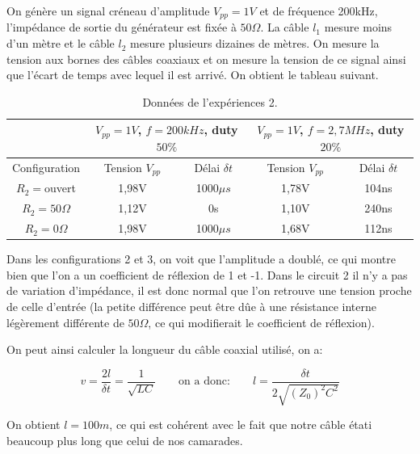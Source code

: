 \documentclass[12pt,a4paper, french]{article}
\begin{document}
    On génère un signal créneau d’amplitude $V_{pp}=1V$ et de fréquence 200kHz, 
    l’impédance de sortie du générateur est fixée à $50\Omega $. La câble $l_1$ mesure moins d’un 
    mètre et le câble $l_2$ mesure plusieurs dizaines de mètres. On mesure la tension aux 
    bornes des câbles coaxiaux et on mesure la tension de ce signal ainsi que l’écart 
    de temps avec lequel il est arrivé. On obtient le tableau suivant. 
    \begin{center}
        \begin{table}[!h]
        \centering
        \begin{tabular}{|c|c|c|c|c|} \hline
            & \multicolumn{2}{c|}{$V_{pp}=1V$, $f=200kHz$, duty $50\%$} &\multicolumn{2}{c|}{$V_{pp}=1V$, $f=2,7MHz$, duty $20\%$}\\ \hline
             Configuration& Tension $V_{pp}$ & Délai $\delta t$& Tension $V_{pp}$ & Délai $\delta t$ \\ \hline
             $R_2=$ouvert & 1,98V & 1000$\mu s$ & 1,78V & 104ns \\ \hline
            $R_2=50\Omega $ &  1,12V & 0s & 1,10V & 240ns\\ \hline
            $R_2=0\Omega $ & 1,98V & 1000$\mu s$& 1,68V&112ns \\ \hline
         \end{tabular}
         \caption{Données de l'expériences 2.}
        \end{table}
    \end{center}
    \medbreak
    
    Dans les configurations 2 et 3, on voit que l'amplitude a doublé, 
    ce qui montre bien que l'on a un coefficient de réflexion de 1 et -1. Dans le 
    circuit 2 il n'y a pas de variation d'impédance, il est donc normal que l'on 
    retrouve une tension proche de celle d'entrée (la petite différence peut être 
    dûe à une résistance interne légèrement différente de $50\Omega $, ce qui modifierait 
    le coefficient de réflexion).
    
    On peut ainsi calculer la longueur du câble coaxial utilisé, on a: 
    \begin{center}
    \begin{equation*}
    v=\frac{2l}{\delta t}=\frac{1}{\sqrt{LC}}\qquad\text{on a donc:}\qquad l=\frac{\delta t}{2\sqrt{(Z_0)^2C^2}}
    \end{equation*}
    \end{center}
    
    On obtient $l=100m$, ce qui est cohérent avec le fait que notre câble
    étati beaucoup plus long que celui de nos camarades.
    
\end{document}
